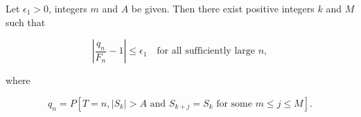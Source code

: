 Let $\epsilon_1 > 0$, integers $m$ and $A$ be given. Then there exist positive integers $k$ and $M$ such that

$$\left| \frac{q_n}{F_n} - 1 \right| \leq \epsilon_1 \quad \text{for all sufficiently large } n,$$

where

$$q_n = P[T = n, |S_k| > A \text{ and } S_{k+j} = S_k \text{ for some } m \leq j \leq M].$$

